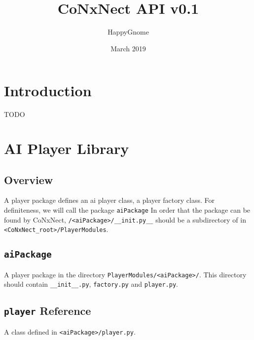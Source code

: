 \documentclass[a4paper,11pt]{article}
\title{CoNxNect API v0.1}
\author{HappyGnome}
\date{March 2019}
\newcommand{\MethodItem}[4]{\item[{\tt #1}]{\bf Args: }#2\\{\bf Desc: }#3\\{\bf Return: }#4}
\begin{document}
\maketitle
\tableofcontents
\section{Introduction}
TODO
\section{AI Player Library}
\subsection{Overview}
A player package defines an ai player class, a player factory class. For definiteness, we will call the package {\tt aiPackage} %
 In order that the package can be found by CoNxNect, {\tt /<aiPackage>/\_\_init.py\_\_} should be a subdirectory of in {\tt <CoNxNect\_root>/PlayerModules}. 
\subsection{\tt aiPackage}
A player package in the directory {\tt PlayerModules/<aiPackage>/}. This directory should contain {\tt \_\_init\_\_.py}, {\tt factory.py} and {\tt player.py}.
\subsection{{\tt player} Reference}
A class defined in {\tt <aiPackage>/player.py}.
\end{document}
